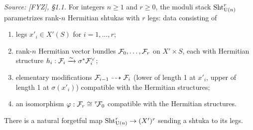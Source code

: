 \begin{definition}
  \label{def:hermitian-shtukas-stack}
  \textit{Source: [FYZ], \S1.1.}
  For integers \(n \geq 1\) and \(r \geq 0\), the moduli stack \(\operatorname{Sht}_{\operatorname{U}(n)}^r\)
  parametrizes rank-\(n\) Hermitian shtukas with \(r\) legs: data consisting of
  \begin{enumerate}
    \item legs \(x'_i \in X'(S)\) for \(i = 1, \ldots, r\);
    \item rank-\(n\) Hermitian vector bundles \(\mathcal{F}_0, \ldots, \mathcal{F}_r\) on
      \(X' \times S\), each with Hermitian structure \(h_i : \mathcal{F}_i \xrightarrow{\sim}
      \sigma^* \mathcal{F}_i^\vee\);
    \item elementary modifications
      \(\mathcal{F}_{i-1} \dashrightarrow \mathcal{F}_i\) (lower of length 1 at \(x'_i\), upper of
      length 1 at \(\sigma(x'_i)\)) compatible with the Hermitian structures;
    \item an isomorphism \(\varphi : \mathcal{F}_r \cong {}^{\tau}\!\mathcal{F}_0\) compatible with
      the Hermitian structures.
  \end{enumerate}
  There is a natural forgetful map \(\operatorname{Sht}_{\operatorname{U}(n)}^r \to (X')^r\) sending a shtuka to
  its legs.
\end{definition}

